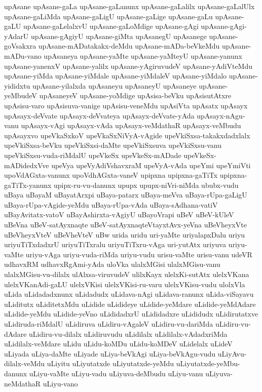 {upAsane
upAsane-gaLa
upAsane-gaLanunx
upAsane-gaLalilx
upAsane-gaLalUlx
upAsane-gaLiMda
upAsane-gaLigU
upAsane-gaLige
upAsane-gaLu
upAsane-gaLU
upAsane-gaLelalxvU
upAsane-gaLoMdige
upAsane-gAgi
upAsane-gAgi-yAdarU
upAsane-gAgiyU
upAsane-giMta
upAsanegU
upAsanege
upAsane-goVsakxra
upAsane-mADatakakx-deMdu
upAsane-mADa-beVkeMdu
upAsane-mADu-vano
upAsaneya
upAsane-yaMte
upAsane-yaMteyU
upAsane-yanunx
upAsane-yanenxV
upAsane-yalilx
upAsane-yAgiruvudeV
upAsane-yAdiVteMdu
upAsane-yiMda
upAsane-yiMdale
upAsane-yiMdaleV
upAsane-yiMdalo
upAsane-yididxtu
upAsane-yilalxda
upAsaneyu
upAsaneyU
upAsaneye
upAsane-yeMbudeV
upAsaneyeV
upAsane-yoMdige
upAsisa-beVku
upAsisutAtxre
upAsisu-varo
upAsisuva-vanige
upAsisu-veneMdu
upAsiVta
upAsatx
upAsayx
upAsayx-deVvate
upAsayx-deVvateya
upAsayx-deVvate-yAda
upAsayx-nAgu-vanu
upAsayx-vAgi
upAsayx-vAda
upAsayx-veMdathaR
upAsayx-veMbudu
upAsayxvo
upeVkaSxkoV
upeVkaSxNiVyA-vAgide
upeVkiSxsa-takakxdadxlalx
upeVkiSxsa-beVku
upeVkiSxsi-daMte
upeVkiSxsuva
upeVkiSxsu-vanu
upeVkiSxsu-vuda-riMdalU
upeVkeSx
upeVkeSx-mADade
upeVkeSx-mADidedxVve
upeVya
upeVyAdiVshavxraM
upeVyA-vAda
upeYmi
upeYmiVti
upoVdAGxta-vanunx
upoVdhAGxta-vaneV
upipxna
upipxna-gaTiTx
upipxna-gaTiTx-yanunx
upipx-ru-vu-danunx
upupx
upupx-niVri-niMda
ububx-vudu
uBaya
uBayaM
uBayatArxpi
uBaya-patarx
uBaya-meVva
uBaya-rUpa-gaLigU
uBaya-rUpa-vAgide-yeMdu
uBaya-rUpa-vAda
uBaya-sAdhana-vatiV
uBayAvitatx-vatoV
uBayAshirxta-vAgiyU
uBayoVrapi
uBeV
uBeV-kUleV
uBeVna
uBeV-satAyxnaqte
uBeV-satAyxnaqteVtayxtAvx-yeVna
uBeVheyxVte
uBeVheyxVteV
uBeVheVteV
uBw
urida
uridu
uri-yaMte
uriyalapxDalu
uriyu
uriyuTiTxdadxrU
uriyuTiTxralu
uriyuTiTxru-vAga
uri-yutAtx
uriyuva
uriyu-vaMte
uriyu-vAga
uriyu-vuda-riMda
uriyu-vudu
urisu-vaMte
urisu-vanu
udeVR
udhavxRM
udhavxRgAmi-yAda
uloVka
ulalxMGisi
ulalxMGisu-vanu
ulalxMGisu-vu-dilalx
ulAlxsa-viruvudeV
ulilxKayx
ulelxKi-sutAtx
ulelxVKana
ulelxVKanAdi-gaLU
ulelxVKisi
ulelxVKisi-ru-varu
ulelxVKisu-vudu
ulolxVla
uLida
uLidadadxnunx
uLidadudx
uLidava-nAgi
uLidava-ranunx
uLida-viSayavu
uLiditutx
uLiditetxMdu
uLidide
uLidideye
uLidide-yeMdare
uLidide-yeMdAdare
uLidide-yeMdu
uLidide-yeVno
uLididadxrU
uLididadxre
uLididudx
uLidirutatxve
uLidiruda-riMdalU
uLidiruva
uLidiru-vAgaleV
uLidiru-vu-dariMda
uLidiru-vu-dAdare
uLidiru-vu-dilalx
uLidiruvudu
uLidilalx
uLidilalx-vAdadxriMda
uLidilalx-veMdare
uLidu
uLidu-koMDu
uLidu-koMDeV
uLidelalx
uLideV
uLiyada
uLiya-daMte
uLiyade
uLiya-beVkAgi
uLiya-beVkAgu-vudu
uLiyAvu-dilalx-veMdu
uLiyitu
uLiyutatxde
uLiyutatxde-yeMdu
uLiyutatxde-yeMbu-danunx
uLiyu-vaMte
uLiyu-vadu
uLiyuva-deMbudu
uLiyu-vanu
uLiyuva-neMdathaR
uLiyu-vano
}
